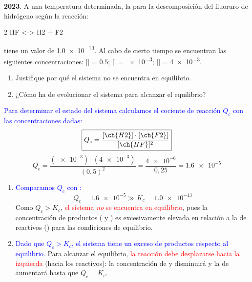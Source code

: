 \begin{exerciseEVAU}
    \textbf{2023}. A una temperatura determinada, la \Kc{} para la descomposición del fluoruro de hidrógeno según la reacción:
    \begin{reaction*}
        2 HF \gas{} <-> H2 \gas{} + F2 \gas{}
    \end{reaction*}
    tiene un valor de \num{1.0e-13}.
    Al cabo de cierto tiempo se encuentran las siguientes concentraciones: [] = \qty{0.5}{\M}; [] = \qty{e-3}{\M}; [] = \qty{4e-3}{\M}.
    \begin{enumerate}[label=\letraminuscula]
        \item Justifique por qué el sistema no se encuentra en equilibrio.
        \item ¿Cómo ha de evolucionar el sistema para alcanzar el equilibrio?
    \end{enumerate}
    \begin{solu}

    \textcolor{blue}{Para determinar el estado del sistema calculamos el cociente de reacción \(Q_c\) con las concentraciones dadas:}
    \[
        \boxed{Q_c = \frac{[\ch{H2}]\cdot[\ch{F2}]}{[\ch{HF}]^2}}
    \]
    \[
        Q_c = \frac{(\num{e-3})\cdot(\num{4e-3})}{(0{,}5)^2} = \frac{\num{4e-6}}{0{,}25} = \num{1.6e-5}
    \]

    \begin{enumerate}[label=\letraminuscula]
        \item \textcolor{blue}{Comparamos \(Q_c\) con \Kc{}:}
        \[
            Q_c = \num{1.6e-5} \gg K_c = \num{1.0e-13}
        \]
        Como \(Q_c > K_c\), \textcolor{red}{el sistema \emph{no} se encuentra en equilibrio}, pues la concentración de productos ( y ) es excesivamente elevada en relación a la de reactivos () para las condiciones de equilibrio.

        \item \textcolor{blue}{Dado que \(Q_c > K_c\), el sistema tiene un exceso de productos respecto al equilibrio.} Para alcanzar el equilibrio, \textcolor{red}{la reacción debe desplazarse hacia la izquierda} (hacia los reactivos): la concentración de  y  disminuirá y la de  aumentará hasta que \(Q_c = K_c\).
    \end{enumerate}

    \end{solu}
\end{exerciseEVAU}


